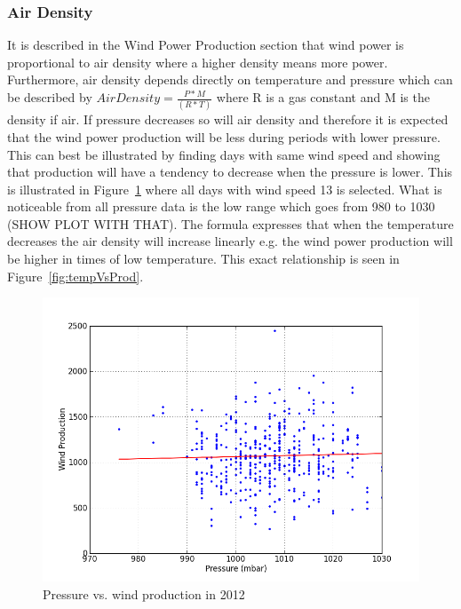 \subsubsection{Air Density}
It is described in the Wind Power Production section that wind power is proportional to air density where a higher density means more power. Furthermore, air density depends directly on temperature and pressure which can be described by $Air Density=\frac{P*M}{(R*T)}$ where R is a gas constant and M is the density if air. If pressure decreases so will air density and therefore it is expected that the wind power production will be less during periods with lower pressure. This can best be illustrated by finding days with same wind speed and showing that production will have a tendency to decrease when the pressure is lower. This is illustrated in Figure~\ref{fig:pressureVsProd} where all days with wind speed 13 is selected. What is noticeable from all pressure data is the low range which goes from 980 to 1030 (SHOW PLOT WITH THAT).
The formula expresses that when the temperature decreases the air density will increase linearly e.g. the wind power production will be higher in times of low temperature. This exact relationship is seen in Figure~\ref{fig:tempVsProd}.
\begin{figure}[h!]
\centering
\includegraphics[width=0.99\linewidth,natwidth=898,natheight=587]{billeder/windProductionForPressure13.png}
\caption{Pressure vs. wind production in 2012}
\label{fig:pressureVsProd}
\end{figure}

